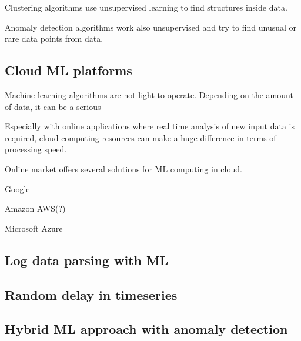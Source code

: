 \documentclass[english, 12pt, a4paper, elec, utf8, a-1b, online]{aaltothesis}
\begin{document}
Clustering algorithms use unsupervised learning
to find structures inside data.

Anomaly detection algorithms work also unsupervised
and try to find unusual or rare data points from data.


\subsection*{Cloud ML platforms}\label{subsec:bg-cloud-ml-platforms}

Machine learning algorithms are not light to operate.
Depending on the amount of data,
it can be a serious %

Especially with online applications
where real time analysis of new input data is required,
cloud computing resources can make a huge difference
in terms of processing speed. %

Online market offers several solutions for ML computing in cloud.

Google

Amazon AWS(?)

Microsoft Azure\cite{altexsoft}




\subsection*{Log data parsing with ML}\label{subsec:log-data-parsing-with-ml}

\subsection*{Random delay in timeseries}\label{subsec:bg-random-delay-in-timeseries}


\subsection*{Hybrid ML approach with anomaly detection}\label{subsec:bg-hybrid-ml-approach-with-anomaly-detection}


\end{document}
